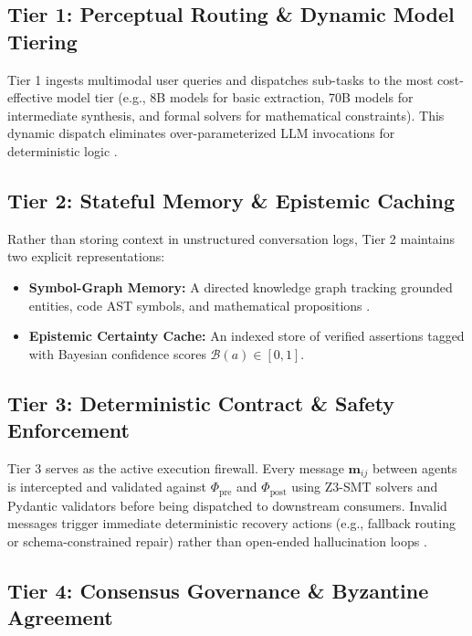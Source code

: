 \documentclass[10pt,twocolumn,letterpaper]{article}
\begin{document}
\subsection{Tier 1: Perceptual Routing \& Dynamic Model Tiering}

Tier 1 ingests multimodal user queries and dispatches sub-tasks to the most cost-effective model tier (e.g., 8B models for basic extraction, 70B models for intermediate synthesis, and formal solvers for mathematical constraints). This dynamic dispatch eliminates over-parameterized LLM invocations for deterministic logic \cite{arxiv_2005_14165,arxiv_2305_18290}.


\subsection{Tier 2: Stateful Memory \& Epistemic Caching}

Rather than storing context in unstructured conversation logs, Tier 2 maintains two explicit representations:
\begin{itemize}
  \item \textbf{Symbol-Graph Memory:} A directed knowledge graph tracking grounded entities, code AST symbols, and mathematical propositions \cite{crossref_10_1145_3689096_3689462}.
  \item \textbf{Epistemic Certainty Cache:} An indexed store of verified assertions tagged with Bayesian confidence scores $\mathcal{B}(a) \in [0, 1]$.
\end{itemize}


\subsection{Tier 3: Deterministic Contract \& Safety Enforcement}

Tier 3 serves as the active execution firewall. Every message $\mathbf{m}_{ij}$ between agents is intercepted and validated against $\Phi_{\text{pre}}$ and $\Phi_{\text{post}}$ using Z3-SMT solvers and Pydantic validators before being dispatched to downstream consumers. Invalid messages trigger immediate deterministic recovery actions (e.g., fallback routing or schema-constrained repair) rather than open-ended hallucination loops \cite{arxiv_2404_01131}.


\subsection{Tier 4: Consensus Governance \& Byzantine Agreement}
\end{document}
